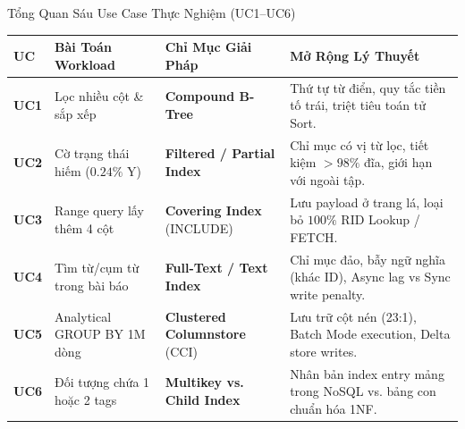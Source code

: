 \documentclass[aspectratio=169,9pt]{beamer}
\begin{document}
\begin{frame}{Tổng Quan Sáu Use Case Thực Nghiệm (UC1--UC6)}
\begin{table}
\centering\footnotesize
\begin{tabularx}{\linewidth}{@{}l l l X@{}}
\toprule
\textbf{UC} & \textbf{Bài Toán Workload} & \textbf{Chỉ Mục Giải Pháp} & \textbf{Mở Rộng Lý Thuyết} \\
\midrule
\textbf{UC1} & Lọc nhiều cột \& sắp xếp & \textbf{Compound B-Tree} & Thứ tự từ điển, quy tắc tiền tố trái, triệt tiêu toán tử Sort. \\
\textbf{UC2} & Cờ trạng thái hiếm ($0.24\%$ Y) & \textbf{Filtered / Partial Index} & Chỉ mục có vị từ lọc, tiết kiệm $>98\%$ đĩa, giới hạn với ngoài tập. \\
\textbf{UC3} & Range query lấy thêm 4 cột & \textbf{Covering Index} (INCLUDE) & Lưu payload ở trang lá, loại bỏ $100\%$ RID Lookup / FETCH. \\
\textbf{UC4} & Tìm từ/cụm từ trong bài báo & \textbf{Full-Text / Text Index} & Chỉ mục đảo, bẫy ngữ nghĩa (khác ID), Async lag vs Sync write penalty. \\
\textbf{UC5} & Analytical GROUP BY 1M dòng & \textbf{Clustered Columnstore} (CCI) & Lưu trữ cột nén (23:1), Batch Mode execution, Delta store writes. \\
\textbf{UC6} & Đối tượng chứa 1 hoặc 2 tags & \textbf{Multikey vs. Child Index} & Nhân bản index entry mảng trong NoSQL vs. bảng con chuẩn hóa 1NF. \\
\bottomrule
\end{tabularx}
\end{table}
\end{frame}
\end{document}

